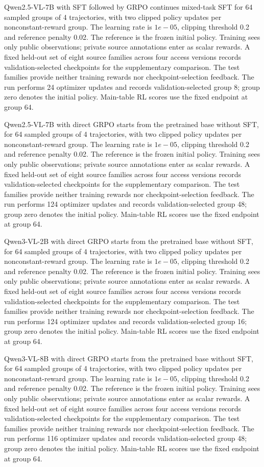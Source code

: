 Qwen2.5-VL-7B with SFT followed by GRPO continues mixed-task SFT for 64 sampled groups of 4 trajectories, with two clipped policy updates per nonconstant-reward group. The learning rate is \(1e-05\), clipping threshold 0.2 and reference penalty 0.02. The reference is the frozen initial policy. Training sees only public observations; private source annotations enter as scalar rewards. A fixed held-out set of eight source families across four access versions records validation-selected checkpoints for the supplementary comparison. The test families provide neither training rewards nor checkpoint-selection feedback. The run performs 24 optimizer updates and records validation-selected group 8; group zero denotes the initial policy. Main-table RL scores use the fixed endpoint at group 64.

Qwen2.5-VL-7B with direct GRPO starts from the pretrained base without SFT, for 64 sampled groups of 4 trajectories, with two clipped policy updates per nonconstant-reward group. The learning rate is \(1e-05\), clipping threshold 0.2 and reference penalty 0.02. The reference is the frozen initial policy. Training sees only public observations; private source annotations enter as scalar rewards. A fixed held-out set of eight source families across four access versions records validation-selected checkpoints for the supplementary comparison. The test families provide neither training rewards nor checkpoint-selection feedback. The run performs 124 optimizer updates and records validation-selected group 48; group zero denotes the initial policy. Main-table RL scores use the fixed endpoint at group 64.

Qwen3-VL-2B with direct GRPO starts from the pretrained base without SFT, for 64 sampled groups of 4 trajectories, with two clipped policy updates per nonconstant-reward group. The learning rate is \(1e-05\), clipping threshold 0.2 and reference penalty 0.02. The reference is the frozen initial policy. Training sees only public observations; private source annotations enter as scalar rewards. A fixed held-out set of eight source families across four access versions records validation-selected checkpoints for the supplementary comparison. The test families provide neither training rewards nor checkpoint-selection feedback. The run performs 124 optimizer updates and records validation-selected group 16; group zero denotes the initial policy. Main-table RL scores use the fixed endpoint at group 64.

Qwen3-VL-8B with direct GRPO starts from the pretrained base without SFT, for 64 sampled groups of 4 trajectories, with two clipped policy updates per nonconstant-reward group. The learning rate is \(1e-05\), clipping threshold 0.2 and reference penalty 0.02. The reference is the frozen initial policy. Training sees only public observations; private source annotations enter as scalar rewards. A fixed held-out set of eight source families across four access versions records validation-selected checkpoints for the supplementary comparison. The test families provide neither training rewards nor checkpoint-selection feedback. The run performs 116 optimizer updates and records validation-selected group 48; group zero denotes the initial policy. Main-table RL scores use the fixed endpoint at group 64.


